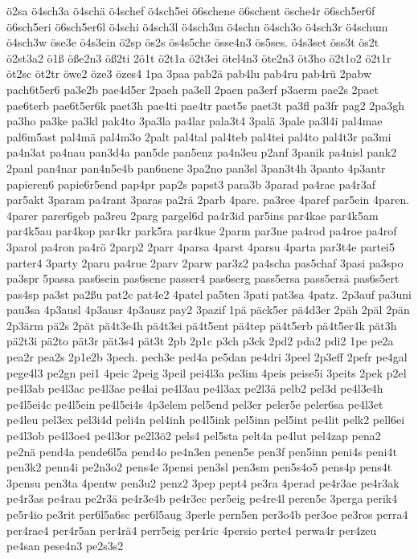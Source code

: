 {ö2sa
ö4sch3a
ö4schä
ö4schef
ö4sch5ei
ö6schene
ö6schent
ösche4r
ö6sch5er6f
ö6sch5eri
ö6sch5er6l
ö4schi
ö4sch3l
ö4sch3m
ö4schn
ö4sch3o
ö4sch3r
ö4schum
ö4sch3w
öse3e
ö4s3ein
ö2sp
ös2s
ös4s5che
össe4n3
ös5ses.
ö4s3set
öss3t
ös2t
ö2st3a2
ö1ß
öße2n3
öß2ti
2ö1t
ö2t1a
ö2t3ei
ötel4n3
öte2n3
öt3ho
ö2t1o2
ö2t1r
öt2sc
öt2tr
öwe2
öze3
özes4
1pa
3paa
pab2ä
pab4lu
pab4ru
pab4rü
2pabw
pach6t5er6
pa3e2b
pae4d5er
2paeh
pa3ell
2paen
pa3erf
p3aerm
pae2s
2paet
pae6terb
pae6t5er6k
paet3h
pae4ti
pae4tr
paet5s
paet3t
pa3fl
pa3fr
pag2
2pa3gh
pa3ho
pa3ke
pa3kl
pak4to
3pa3la
pa4lar
pala3t4
3palä
3pale
pa3l4i
pal4mae
pal6m5ast
pal4mä
pal4m3o
2palt
pal4tal
pal4teb
pal4tei
pal4to
pal4t3r
pa3mi
pa4n3at
pa4nau
pan3d4a
pan5de
pan5enz
pa4n3eu
p2anf
3panik
pa4nisl
pank2
2panl
pan4nar
pan4n5e4b
pan6nene
3pa2no
pan3sl
3pan3t4h
3panto
4p3antr
papieren6
papie6r5end
pap4pr
pap2s
papst3
para3b
3parad
pa4rae
pa4r3af
par5akt
3param
pa4rant
3paras
pa2rä
2parb
4pare.
pa3ree
4paref
par5ein
4paren.
4parer
parer6geb
pa3reu
2parg
pargel6d
pa4r3id
par5ins
par4kae
par4k5am
par4k5au
par4kop
par4kr
park5ra
par4kue
2parm
par3ne
pa4rod
pa4roe
pa4rof
3parol
pa4ron
pa4rö
2parp2
2parr
4parsa
4parst
4parsu
4parta
par3t4e
partei5
parter4
3party
2paru
pa4rue
2parv
2parw
par3z2
pa4scha
pas5chaf
3pasi
pa3spo
pa3spr
5passa
pas6sein
pas6sene
passer4
pas6serg
pass5ersa
pass5ersä
pas6s5ert
pas4sp
pa3st
pa2ßu
pat2c
pat4e2
4patel
pa5ten
3pati
pat3sa
4patz.
2p3auf
pa3uni
pau3sa
4p3ausl
4p3ausr
4p3ausz
pay2
3pazif
1pä
päck5er
pä4d3er
2päh
2päl
2pän
2p3ärm
pä2s
2pät
pä4t3e4h
pä4t3ei
pä4t5ent
pä4tep
pä4t5erb
pä4t5er4k
pät3h
pä2t3i
pä2to
pät3r
pät3s4
pät3t
2pb
2p1c
p3ch
p3ck
2pd2
pda2
pdi2
1pe
pe2a
pea2r
pea2s
2p1e2b
3pech.
pech3e
ped4a
pe5dan
pe4dri
3peel
2p3eff
2pefr
pe4gal
pege4l3
pe2gn
pei1
4peic
2peig
3peil
pei4l3a
pe3im
4peis
peise5i
3peits
2pek
p2el
pe4l3ab
pe4l3ac
pe4l3ae
pe4lai
pe4l3au
pe4l3ax
pe2l3ä
pelb2
pel3d
pe4l3e4h
pe4l5ei4c
pe4l5ein
pe4l5ei4s
4p3elem
pel5end
pel3er
peler5e
peler6sa
pe4l3et
pe4leu
pel3ex
pel3i4d
peli4n
pel4inh
pe4l5ink
pel5inn
pel5int
pe4lit
pelk2
pell6ei
pe4l3ob
pe4l3oe4
pe4l3or
pe2l3ö2
pels4
pel5sta
pelt4a
pe4lut
pel4zap
pena2
pe2nä
pend4a
pende6l5a
pend4o
pe4n3en
penen5e
pen3f
pen5inn
peni4s
peni4t
pen3k2
penn4i
pe2n3o2
pens4e
3pensi
pen3sl
pen3sm
pen5s4o5
pens4p
pens4t
3pensu
pen3ta
4pentw
pen3u2
penz2
3pep
pept4
pe3ra
4perad
pe4r3ae
pe4r3ak
pe4r3as
pe4rau
pe2r3ä
pe4r3e4b
pe4r3ec
per5eig
pe4re4l
peren5e
3perga
perik4
pe5r4io
pe3rit
per6l5a6sc
per6l5aug
3perle
pern5en
per3o4b
per3oe
pe3ros
perra4
per4rae4
per4r5an
per4rä4
perr5eig
per4ric
4persio
perte4
perwa4r
per4zeu
pe4san
pese4n3
pe2s3s2
}
